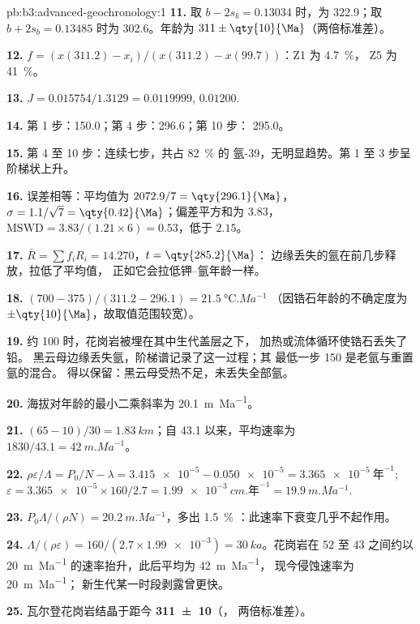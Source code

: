 \begin{solution}{pb:b3:advanced-geochronology:1}
\textbf{11.} 取 $b - 2s_b = 0.13034$ 时，为
\qty{322.9}{\Ma}；取 $b + 2s_b = 0.13485$ 时为 \qty{302.6}{\Ma}。年龄为
$311 \pm \qty{10}{\Ma}$（两倍标准差）。

\textbf{12.} $f = (x(311.2) - x_i)/(x(311.2) - x(99.7))$：Z1 为 \qty{4.7}{\percent}，
Z5 为 \qty{41}{\percent}。

\textbf{13.} $J = 0.015754/1.3129 = 0.0119999$, $0.01200$.

\textbf{14.} 第 1 步：\qty{150.0}{\Ma}；第 4 步：\qty{296.6}{\Ma}；第 10 步：
\qty{295.0}{\Ma}。

\textbf{15.} 第 4 至 10 步：连续七步，共占 \qty{82}{\percent} 的
氩-39，无明显趋势。第 1 至 3 步呈阶梯状上升。

\textbf{16.} 误差相等：平均值为 $2072.9/7 = \qty{296.1}{\Ma}$，$\sigma =
1.1/\sqrt7 = \qty{0.42}{\Ma}$；偏差平方和为 $3.83$，
$\mathrm{MSWD} = 3.83/(1.21\times6) = 0.53$，低于 $2.15$。

\textbf{17.} $\bar R = \sum f_iR_i = 14.270$，$t = \qty{285.2}{\Ma}$：
边缘丢失的氩在前几步释放，拉低了平均值，
正如它会拉低钾–氩年龄一样。

\textbf{18.} $(700 - 375)/(311.2 - 296.1) = \qty{21.5}{\celsius.Ma^{-1}}$
（因锆石年龄的不确定度为 $\pm\qty{10}{\Ma}$，故取值范围较宽）。

\textbf{19.} 约 \qty{100}{\Ma} 时，花岗岩被埋在其中生代盖层之下，
加热或流体循环使锆石丢失了铅。
黑云母边缘丢失氩，阶梯谱记录了这一过程；其
最低一步 \qty{150}{\Ma} 是老氩与重置氩的混合。
得以保留：黑云母受热不足，未丢失全部氩。

\textbf{20.} 海拔对年龄的最小二乘斜率为
\qty{20.1}{m.Ma^{-1}}。

\textbf{21.} $(65 - 10)/30 = \qty{1.83}{km}$；自 \qty{43.1}{\Ma} 以来，平均速率为
$1830/43.1 = \qty{42}{m.Ma^{-1}}$。

\textbf{22.} $\rho\varepsilon/\Lambda = P_0/N - \lambda = \num{3.415e-5} -
\num{0.050e-5} = \qty{3.365e-5}{\text{年}^{-1}}$; $\varepsilon = \num{3.365e-5}\times
160/2.7 = \qty{1.99e-3}{cm.\text{年}^{-1}} = \qty{19.9}{m.Ma^{-1}}$.

\textbf{23.} $P_0\Lambda/(\rho N) = \qty{20.2}{m.Ma^{-1}}$，多出 \qty{1.5}{\percent}
：此速率下衰变几乎不起作用。

\textbf{24.} $\Lambda/(\rho\varepsilon) = 160/(2.7\times\num{1.99e-3}) =
\qty{30}{ka}$。花岗岩在 52 至
\qty{43}{\Ma} 之间约以 \qty{20}{m.Ma^{-1}} 的速率抬升，此后平均为 \qty{42}{m.Ma^{-1}}，
现今侵蚀速率为 \qty{20}{m.Ma^{-1}}；
新生代某一时段剥露曾更快。

\textbf{25.} 瓦尔登花岗岩结晶于距今
\textbf{\qty[text-series-to-math=true, separate-uncertainty=true]{311 \pm 10}{\Ma}}（，
两倍标准差）。
\end{solution}
